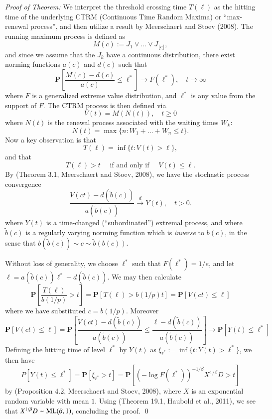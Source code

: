 \documentclass[]{elsarticle} %
\begin{document}
\emph{Proof of Theorem:} We interpret the threshold crossing time
\(T(\ell)\) as the hitting time of the underlying CTRM (Continuous Time
Random Maxima) or ``max-renewal process'', and then utilize a result by
Meerschaert and Stoev (2008). The running maximum process is defined as
\[
M(c) := J_1 \vee \ldots \vee J_{\lfloor c \rfloor},
\] and since we assume that the \(J_k\) have a continuous distribution,
there exist norming functions \(a(c)\) and \(d(c)\) such that \[
\mathbf P\left[ \frac{M(c) - d(c)}{a(c)} \le \ell^* \right] 
\longrightarrow F(\ell^*), \quad t \to \infty
\] where \(F\) is a generalized extreme value distribution, and
\(\ell^*\) is any value from the support of \(F\). The CTRM process is
then defined via \[
V(t) = M(N(t)), \quad t \ge 0
\] where \(N(t)\) is the renewal process associated with the waiting
times \(W_k\): \[
N(t) = \max\{n: W_1 + \ldots + W_n \le t\}.
\] Now a key observation is that \[
T(\ell) = \inf\{t: V(t) > \ell\}, 
\] and that \[
T(\ell) > t \quad \text{ if and only if } \quad V(t) \le \ell.
\] By (Theorem 3.1, Meerschaert and Stoev, 2008), we have the stochastic
process convergence \[
\frac{V(ct) - d(\tilde b(c))}{a(\tilde b(c))} 
\stackrel{d}{\longrightarrow} Y(t), \quad t > 0.
\] where \(Y(t)\) is a time-changed (``subordinated'') extremal process,
and where \(\tilde b(c)\) is a regularly varying norming function which
is \emph{inverse} to \(b(c)\), in the sense that
\(b(\tilde b(c)) \sim c \sim \tilde b(b(c))\).

Without loss of generality, we choose \(\ell^*\) such that
\(F(\ell^*) = 1/e\), and let
\(\ell = a(\tilde b(c)) \ell^* + d(\tilde b(c))\). We may then calculate
\[
\mathbf P\left[ \frac{T(\ell)}{b(1/p)} > t \right]
= \mathbf P[T(\ell) > b(1/p) t]
= \mathbf P[V(ct) \le \ell]
\] where we have substituted \(c = b(1/p)\). Moreover \[
\mathbf P[V(ct) \le \ell]
= \mathbf P\left[ \frac{V(ct) - d(\tilde b(c))}{a(\tilde b(c))} 
\le \frac{\ell - d(\tilde b(c))}{a(\tilde b(c))} \right]
\longrightarrow \mathbf P\left[ Y(t) \le \ell^* \right]
\] Defining the hitting time of level \(\ell^*\) by \(Y(t)\) as
\(\xi_{\ell^*} := \inf\{t: Y(t) > \ell^*\}\), we then have \[
P\left[ Y(t) \le \ell^* \right] = \mathbf P[\xi_{\ell^*} > t] 
= \mathbf P[(-\log F(\ell^*))^{-1/\beta} X^{1/\beta} D > t]
\] by (Proposition 4.2, Meerschaert and Stoev, 2008), where \(X\) is an
exponential random variable with mean \(1\). Using (Theorem 19.1,
Haubold et al., 2011), we see that
\(X^{1/\beta} D \sim {\rm ML}(\beta, 1)\), concluding the proof. \qed  
\end{document}
